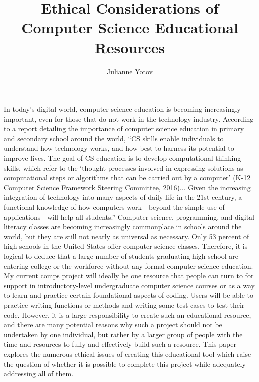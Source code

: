 \documentclass[10pt,twocolumn]{article}
\title{Ethical Considerations of Computer Science Educational Resources}
\author{Julianne Yotov}
\affiliation{Occidental College}
\begin{document}
\maketitle

In today’s digital world, computer science education is becoming increasingly important, even for those that do not work in the technology industry. According to a report detailing the importance of computer science education in primary and secondary school around the world, “CS skills enable individuals to understand how technology works, and how best to harness its potential to improve lives. The goal of CS education is to develop computational thinking skills, which refer to the ‘thought processes involved in expressing solutions as computational steps or algorithms that can be carried out by a computer’ (K-12 Computer Science Framework Steering Committee, 2016)... Given the increasing integration of technology into many aspects of daily life in the 21st century, a functional knowledge of how computers work—beyond the simple use of applications—will help all students.”\cite{Brookings} Computer science, programming, and digital literacy classes are becoming increasingly commonplace in schools around the world, but they are still not nearly as universal as necessary. Only 53 percent of high schools in the United States offer computer science classes.\cite{Cal} Therefore, it is logical to deduce that a large number of students graduating high school are entering college or the workforce without any formal computer science education. My current comps project will ideally be one resource that people can turn to for support in introductory-level undergraduate computer science courses or as a way to learn and practice certain foundational aspects of coding. Users will be able to practice writing functions or methods and writing some test cases to test their code. However, it is a large responsibility to create such an educational resource, and there are many potential reasons why such a project should not be undertaken by one individual, but rather by a larger group of people with the time and resources to fully and effectively build such a resource. This paper explores the numerous ethical issues of creating this educational tool which raise the question of whether it is possible to complete this project while adequately addressing all of them.
\end{document}
